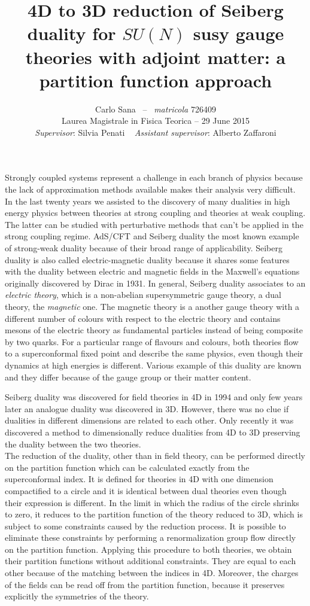\documentclass[a4paper,12pt]{article}
\author{
 Carlo Sana  ~--~ \emph{matricola} 726409 \\
 Laurea Magistrale in Fisica Teorica -- 29 June 2015\\
\emph{Supervisor}: Silvia Penati 
~
\emph{Assistant supervisor}: Alberto Zaffaroni\\
}
\date{}
\title{ \textbf{4D to 3D reduction of Seiberg duality for $SU(N)$ susy gauge theories with adjoint matter: a partition function approach }}
\begin{document}
\maketitle
Strongly coupled systems represent a challenge in each branch of physics because the lack of approximation methods available makes their analysis very difficult.\\
In the last twenty years we assisted to the discovery of many dualities in high energy physics between theories at strong coupling and theories at weak coupling.
The latter can be studied with perturbative methods that can't be applied in the strong coupling regime.
AdS/CFT and Seiberg duality the most known example of strong-weak duality because of their broad range of applicability.
Seiberg duality is also called electric-magnetic duality because it shares some features with the duality between electric and magnetic fields in the Maxwell's equations originally discovered by Dirac in 1931.
In general, Seiberg duality associates to an \emph{electric theory}, which is a non-abelian supersymmetric gauge theory, a dual theory, the \emph{magnetic} one. 
The magnetic theory is a another gauge theory with a different number of colours with respect to the electric theory and contains mesons of the electric theory as fundamental particles instead of being composite by two quarks.
For a particular range of flavours and colours, both theories flow to a superconformal fixed point and describe the same physics, even though their dynamics at high energies is different.
Various example of this duality are known and they differ because of the gauge group or their matter content.

Seiberg duality was discovered for field theories in 4D in 1994 and only few years later an analogue duality was discovered in 3D.
However, there was no clue if dualities in different dimensions are related to each other.
Only recently it was discovered a method to dimensionally reduce dualities from 4D to 3D preserving the duality between the two theories.\\
The reduction of the duality, other than in field theory, can be performed directly on the partition function which can be calculated exactly from the superconformal index. 
It is defined for theories in 4D with one dimension compactified to a circle and it is identical between dual theories even though their expression is different.
In the limit in which the radius of the circle shrinks to zero, it reduces to the partition function of the theory reduced to 3D, which is subject to some constraints caused by the reduction process.
It is possible to eliminate these constraints by performing a renormalization group flow directly on the partition function.
Applying this procedure to both theories, we obtain their partition functions without additional constraints. 
They are equal to each other because of the matching between the indices in 4D.
Moreover, the charges of the fields can be read off from the partition function, because it preserves explicitly the symmetries of the theory.
\end{document}
